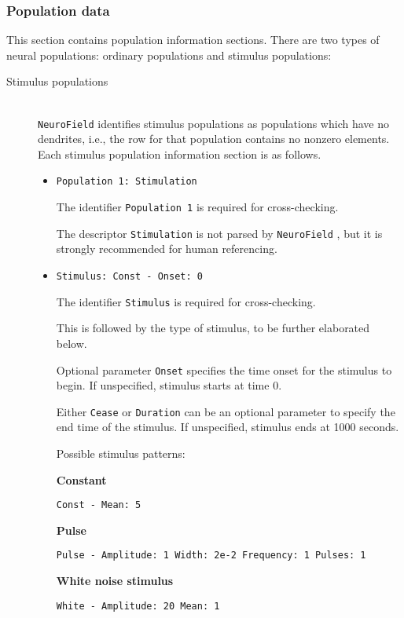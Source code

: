 \documentclass[12pt,a4paper]{article}
\newcommand{\type}[1]{ {\small\small\tt #1} }
\newcommand{\NF}[0]{ \type{NeuroField}}
\begin{document}
\subsubsection{Population data}
\label{sec:pop}
This section contains population information sections. There are two types of neural populations: ordinary populations and stimulus populations:
\begin{description}

\item[Stimulus populations]\ \\

\NF identifies stimulus populations as populations which have no dendrites, i.e., the row for that population contains no nonzero elements.  Each stimulus population information section is as follows.
\begin{itemize}
	\item \begin{lstlisting}
Population 1: Stimulation
	\end{lstlisting}
	The identifier \type{Population 1} is required for cross-checking.

	The descriptor \type{Stimulation} is not parsed by \NF, but it is strongly recommended for human referencing.
	\item
	\begin{lstlisting}
Stimulus: Const - Onset: 0
	\end{lstlisting}
	The identifier \type{Stimulus} is required for cross-checking.

	This is followed by the type of stimulus, to be further elaborated below.

	Optional parameter \type{Onset} specifies the time onset for the stimulus to begin. If unspecified, stimulus starts at time 0.

	Either \type{Cease} or \type{Duration} can be an optional parameter to specify the end time of the stimulus. If unspecified, stimulus ends at 1000 seconds.

	Possible stimulus patterns:

	\textbf{Constant}
	\begin{lstlisting}
Const - Mean: 5
	\end{lstlisting}

	\textbf{Pulse}
	\begin{lstlisting}
Pulse - Amplitude: 1 Width: 2e-2 Frequency: 1 Pulses: 1
	\end{lstlisting}

	\textbf{White noise stimulus}
	\begin{lstlisting}
White - Amplitude: 20 Mean: 1
	\end{lstlisting}


\end{itemize}
\end{description}
\end{document}
